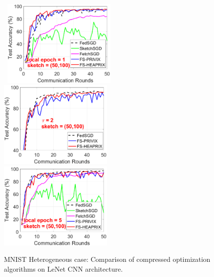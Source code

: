 \documentclass{article}
\begin{document}
\begin{figure}[H]
\begin{center}
		\mbox{\hspace{-0.15in}	
		\includegraphics[width=2.2in]{MNIST_figures/local1_sketch50_iid0_test_acc.eps} \hspace{-0.15in}
		\includegraphics[width=2.2in]{MNIST_figures/local2_sketch50_iid0_test_acc.eps} \hspace{-0.15in}
		\includegraphics[width=2.2in]{MNIST_figures/local5_sketch50_iid0_test_acc.eps}
		}
	\end{center}
	\caption{MNIST Heterogeneous case: Comparison of compressed optimization algorithms on LeNet CNN architecture.}
    \label{fig:MNIST-iid0-app}
\end{figure}
\end{document}
